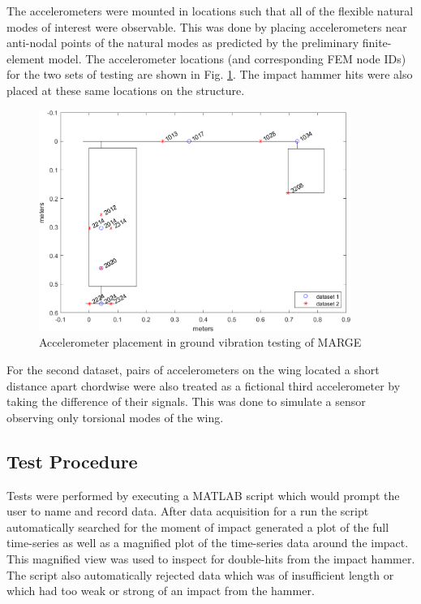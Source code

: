 The accelerometers were mounted in locations such that all of the flexible natural modes of interest were observable. This was done by placing accelerometers near anti-nodal points of the natural modes as predicted by the preliminary finite-element model. The accelerometer locations (and corresponding FEM node IDs) for the two sets of testing are shown in Fig. \ref{fig:accelPlacement}. The impact hammer hits were also placed at these same locations on the structure.
\begin{figure}[h]
    \centering
    \label{fig:accelPlacement}
    \includegraphics[width=4in]{figs/GVT/accelLocPlot.png}
    \caption{Accelerometer placement in ground vibration testing of MARGE}
\end{figure}

For the second dataset, pairs of accelerometers on the wing located a short distance apart chordwise were also treated as a fictional third accelerometer by taking the difference of their signals. This was done to simulate a sensor observing only torsional modes of the wing.

\subsection{Test Procedure}

Tests were performed by executing a MATLAB script which would prompt the user to name and record data. After data acquisition for a run the script automatically searched for the moment of impact generated a plot of the full time-series as well as a magnified plot of the time-series data around the impact. This magnified view was used to inspect for double-hits from the impact hammer. The script also automatically rejected data which was of insufficient length or which had too weak or strong of an impact from the hammer.

